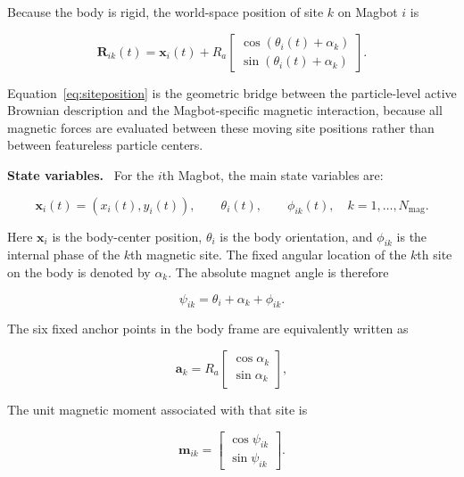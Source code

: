 \documentclass[12pt,a4paper,oneside]{report}
\newcommand{\runin}[1]{\vspace{0.45em}\noindent\textbf{#1.}\ }
\begin{document}
Because the body is rigid, the world-space position of site $k$ on Magbot $i$ is

\begin{equation}
\mathbf{R}_{ik}(t)=
\mathbf{x}_i(t)+
R_a
\begin{bmatrix}
\cos(\theta_i(t)+\alpha_k)\\
\sin(\theta_i(t)+\alpha_k)
\end{bmatrix}.
\label{eq:siteposition}
\end{equation}

Equation~\ref{eq:siteposition} is the geometric bridge between the particle-level active Brownian description and the Magbot-specific magnetic interaction, because all magnetic forces are evaluated between these moving site positions rather than between featureless particle centers.

\runin{State variables}
For the $i$th Magbot, the main state variables are:

\begin{equation}
\mathbf{x}_i(t) = (x_i(t),y_i(t)), \qquad
\theta_i(t), \qquad
\phi_{ik}(t), \quad k=1,\ldots,N_{\mathrm{mag}}.
\end{equation}

Here $\mathbf{x}_i$ is the body-center position, $\theta_i$ is the body orientation, and $\phi_{ik}$ is the internal phase of the $k$th magnetic site. The fixed angular location of the $k$th site on the body is denoted by $\alpha_k$. The absolute magnet angle is therefore

\begin{equation}
\psi_{ik} = \theta_i + \alpha_k + \phi_{ik}.
\end{equation}

The six fixed anchor points in the body frame are equivalently written as

\begin{equation}
\mathbf{a}_k =
R_a
\begin{bmatrix}
\cos \alpha_k \\ \sin \alpha_k
\end{bmatrix},
\end{equation}

The unit magnetic moment associated with that site is

\begin{equation}
\mathbf{m}_{ik}=
\begin{bmatrix}
\cos \psi_{ik}\\
\sin \psi_{ik}
\end{bmatrix}.
\label{eq:magmoment}
\end{equation}
\end{document}
